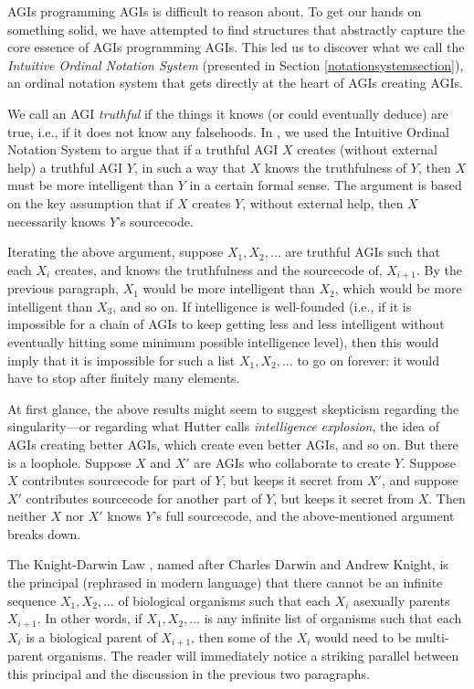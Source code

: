 \documentclass[runningheads]{llncs}
\begin{document}
AGIs programming AGIs is difficult to reason about. To get our hands on something solid,
we have attempted to find structures that abstractly capture the core essence of
AGIs programming AGIs. This led us to discover
what we call the \emph{Intuitive Ordinal Notation System} (presented in Section
\ref{notationsystemsection}), an ordinal notation system that gets directly at
the heart of AGIs creating AGIs.

We call an AGI \emph{truthful} if the things it knows (or could eventually deduce) are true,
i.e., if it does not know any falsehoods.
In \cite{alexander2019measuring}, we used the Intuitive Ordinal Notation System to argue
that if a truthful AGI $X$ creates (without external help) a truthful AGI $Y$, in such a way
that $X$ knows the truthfulness of $Y$, then $X$ must be more intelligent than $Y$
in a certain formal sense. The argument is based on the key assumption that if $X$
creates $Y$, without external help, then $X$ necessarily knows $Y$'s sourcecode.

Iterating the above argument, suppose $X_1,X_2,\ldots$
are truthful AGIs such that each $X_i$ creates, and knows the truthfulness and
the sourcecode of, $X_{i+1}$. By the previous paragraph, $X_1$ would be more
intelligent than $X_2$, which would be more
intelligent than $X_3$, and so on. If intelligence is well-founded (i.e.,
if it is impossible for a chain of AGIs to keep getting less and less intelligent
without eventually hitting some minimum possible intelligence level),
then this would imply that it is impossible for such
a list $X_1,X_2,\ldots$ to go on forever: it would have to stop after finitely
many elements.

At first glance, the above results might
seem to suggest skepticism regarding the singularity---or regarding
what Hutter \cite{hutter2012} calls \emph{intelligence explosion}, the idea of
AGIs creating better AGIs, which create even better AGIs, and so on.
But there is a loophole. Suppose $X$ and $X'$ are AGIs
who collaborate to create $Y$. Suppose $X$ contributes sourcecode for
part of $Y$, but keeps it secret from $X'$, and suppose $X'$ contributes
sourcecode for another part of $Y$, but keeps it secret from $X$. Then neither
$X$ nor $X'$ knows $Y$'s full sourcecode, and the above-mentioned argument
breaks down.


The Knight-Darwin Law \cite{darwin1898knight}, named after Charles Darwin
and Andrew Knight, is the
principal (rephrased in modern language) that there cannot be an infinite
sequence $X_1,X_2,\ldots$ of biological organisms such that each $X_i$ asexually
parents $X_{i+1}$. In other words, if $X_1,X_2,\ldots$ is any infinite list of
organisms such that each $X_i$ is a biological parent of $X_{i+1}$, then some of the
$X_i$ would need to be multi-parent organisms.
The reader will immediately notice a striking parallel between
this principal and the discussion in the previous two paragraphs.
\end{document}

